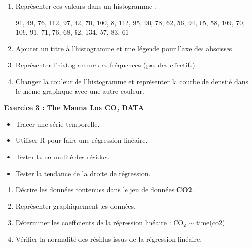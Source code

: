 \documentclass[a4paper,12pt]{article}
\begin{document}
\begin{enumerate}
    \item Représenter ces valeurs dans un histogramme :

    \begin{center}
    91, 49, 76, 112, 97, 42, 70, 100, 8, 112, 95, 90, 78, 62, 56, 94, 65, 58, 109, 70, 109, 91, 71, 76, 68, 62, 134, 57, 83, 66
    \end{center}

    \item Ajouter un titre à l'histogramme et une légende pour l'axe des abscisses.

    \item Représenter l'histogramme des fréquences (pas des effectifs).

    \item Changer la couleur de l'histogramme et représenter la courbe de densité dans le même graphique avec une autre couleur.
\end{enumerate}

\begin{exercicebox}
\textbf{Exercice 3 : The Mauna Loa CO$_2$ DATA}
\end{exercicebox}

\begin{objectif}
\begin{itemize}
    \item Tracer une série temporelle.
    \item Utiliser R pour faire une régression linéaire.
    \item Tester la normalité des résidus.
    \item Tester la tendance de la droite de régression.
\end{itemize}
\end{objectif}

\begin{questionbox}
\begin{enumerate}
    \item Décrire les données contenues dans le jeu de données \textbf{CO2}.
    \item Représenter graphiquement les données.
    \item Déterminer les coefficients de la régression linéaire : CO$_2$ $\sim$ time(co2).
    \item Vérifier la normalité des résidus issus de la régression linéaire.
\end{enumerate}
\end{questionbox}
\end{document}
